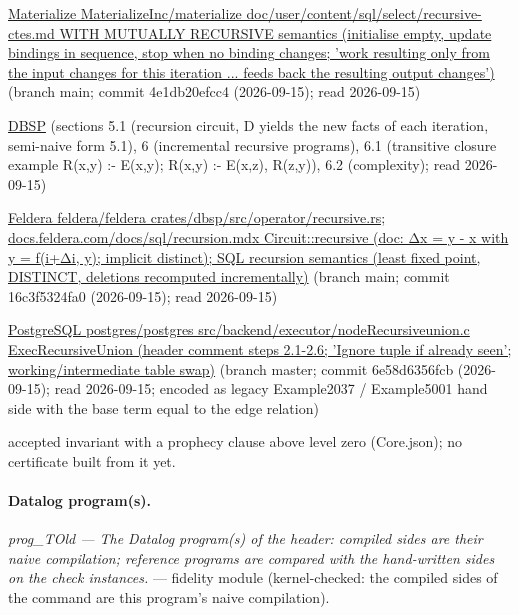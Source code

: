 \documentclass[10pt]{article}
\begin{document}
\begin{description}[leftmargin=2.6cm,style=nextline,itemsep=1pt]
\item[Sources] {\raggedright \href{https://materialize.com/docs/sql/select/recursive-ctes/}{Materialize MaterializeInc/materialize doc/user/content/sql/select/recursive-ctes.md WITH MUTUALLY RECURSIVE semantics (initialise empty, update bindings in sequence, stop when no binding changes; 'work resulting only from the input changes for this iteration ... feeds back the resulting output changes')} (branch main; commit 4e1db20efcc4 (2026-09-15); read 2026-09-15) \par \href{https://arxiv.org/abs/2203.16684}{DBSP} (sections 5.1 (recursion circuit, D yields the new facts of each iteration, semi-naive form 5.1), 6 (incremental recursive programs), 6.1 (transitive closure example R(x,y) :- E(x,y); R(x,y) :- E(x,z), R(z,y)), 6.2 (complexity); read 2026-09-15) \par \href{https://github.com/feldera/feldera/blob/main/crates/dbsp/src/operator/recursive.rs}{Feldera feldera/feldera crates/dbsp/src/operator/recursive.rs; docs.feldera.com/docs/sql/recursion.mdx Circuit::recursive (doc: Δx = y - x with y = f(i+Δi, y); implicit distinct); SQL recursion semantics (least fixed point, DISTINCT, deletions recomputed incrementally)} (branch main; commit 16c3f5324fa0 (2026-09-15); read 2026-09-15) \par \href{https://github.com/postgres/postgres/blob/master/src/backend/executor/nodeRecursiveunion.c}{PostgreSQL postgres/postgres src/backend/executor/nodeRecursiveunion.c ExecRecursiveUnion (header comment steps 2.1-2.6; 'Ignore tuple if already seen'; working/intermediate table swap)} (branch master; commit 6e58d6356fcb (2026-09-15); read 2026-09-15; encoded as legacy Example2037 / Example5001 hand side with the base term equal to the edge relation)\par}

\item[Prophecy] accepted invariant with a prophecy clause above level zero (Core.json); no certificate built from it yet.

\end{description}

\paragraph{Datalog program(s).}

{\raggedright\textit{prog\_TOld --- The Datalog program(s) of the header: compiled sides are their naive compilation; reference programs are compared with the hand-written sides on the check instances.} --- fidelity module (kernel-checked: the compiled sides of the command are this program's naive compilation).\par}
\end{document}
